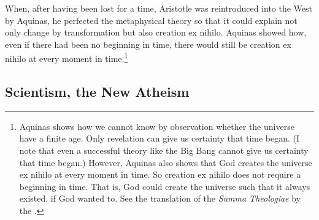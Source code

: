 \documentclass[twocolumn]{article}
\begin{document}
When, after having been lost for a time, Aristotle was reintroduced into the
West by Aquinas, he perfected the metaphysical theory so that it could explain
not only change by transformation but also creation ex nihilo.  Aquinas showed
how, even if there had been no beginning in time, there would still be creation
ex nihilo at every moment in time.\footnote{%
   Aquinas shows how we cannot know by observation whether the universe have a
   finite age.  Only revelation can give us certainty that time began.  (I note
   that even a successful theory like the Big Bang cannot give us certainty
   that time began.)  However, Aquinas also shows that God creates the universe
   ex nihilo at every moment in time.  So creation ex nihilo does not require a
   beginning in time.  That is, God could create the universe such that it
   always existed, if God wanted to.  See the translation of the {\it Summa
   Theologiae} by the \citet[I, Q45, A1, and I, Q46, A1]{e1920}.
}

\subsection{Scientism, the New Atheism}
\end{document}
